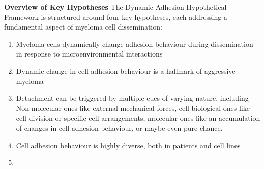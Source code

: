 
\textbf{Overview of Key Hypotheses}
The Dynamic Adhesion Hypothetical Framework is structured around four key
hypotheses, each addressing a fundamental aspect of myeloma cell dissemination:
\begin{enumerate}
      \item Myeloma cells dynamically change adhesion behaviour during
            dissemination in response to microenvironmental interactions
      \item Dynamic change in cell adhesion behaviour is a hallmark of
            aggressive myeloma
      \item Detachment can be triggered by multiple cues of varying nature,
            including Non-molecular ones like external mechanical forces, cell
            biological ones like cell division or specific cell arrangements,
            molecular ones like an accumulation of changes in cell adhesion
            behaviour, or maybe even pure chance.


      \item Cell adhesion behaviour is highly diverse, both in patients and cell
            lines

      \item
\end{enumerate}

